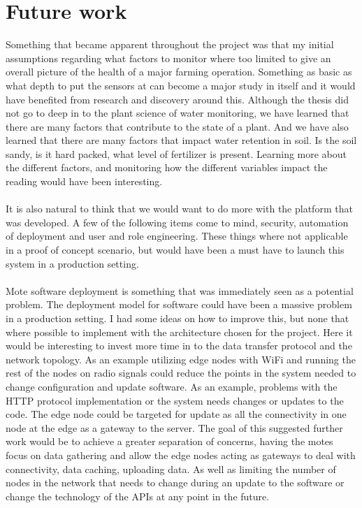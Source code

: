 \documentclass[]{uiophd}
\begin{document}
\section{Future work}
Something that became apparent throughout the project was that my initial assumptions regarding what factors to monitor where too limited to give  an overall picture of the health of a major farming operation. Something as basic as what depth to put the sensors at can become a  major study in itself and it would have benefited from research and discovery around this. Although the thesis did not go to deep in to the plant science of water monitoring, we have learned that there are many factors that contribute to the state of a plant. And we have also learned that there are many factors that impact water retention in soil. Is the soil sandy, is it hard packed, what level of fertilizer is present. Learning more about the different factors, and monitoring how the different variables impact the reading would have been interesting.
\\\\
It is also natural to think that we would want to do more with the platform that was developed. A few of the following items come to mind, security, automation of deployment and user and role engineering. These things where not applicable in a proof of concept scenario, but would have been a must have to  launch this system in a production setting.
\\\\
Mote software deployment is something that was immediately seen as a potential problem. The deployment model for software could have been a massive problem in a production setting. I had some ideas on how to improve this, but none that where possible to implement with the architecture chosen for the project. Here it would be interesting to invest more time in to the data transfer protocol and the network topology. As an example utilizing edge nodes with WiFi and running the rest of the nodes on radio signals could reduce the points in the system needed to change configuration and update software. As an example, problems with the HTTP protocol implementation or the system needs changes or updates to the code. The edge node could be targeted for update as all the connectivity in one node at the edge as a gateway to the server. The goal of this suggested further work would be to achieve a greater separation of concerns, having the motes focus on data gathering and allow the edge nodes acting as gateways to deal with connectivity, data caching, uploading data. As well as limiting the number of nodes in the network that needs to change during an update to the software or change the technology of the APIs at any point in the future.
\end{document}
